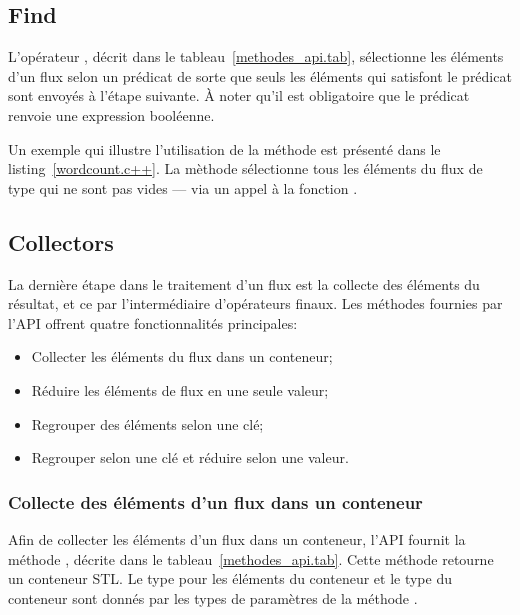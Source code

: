 \subsection{Find}

L'op\'erateur , d\'ecrit dans le tableau~\ref{methodes_api.tab}, s\'electionne les \'el\'ements d'un flux selon un pr\'edicat de sorte que seuls les \'el\'ements qui  satisfont le pr\'edicat sont envoy\'es \`a l'\'etape suivante. \`A noter qu'il est obligatoire que le pr\'edicat renvoie une expression bool\'eenne. 

Un exemple qui illustre l'utilisation de la m\'ethode  est pr\'esent\'e dans le listing~\ref{wordcount.c++}. La m\`ethode  s\'electionne tous les \'el\'ements du flux de type  qui ne sont pas vides --- via un appel \`a la fonction .


\subsection{Collectors}

La derni\`ere \'etape dans le traitement d'un flux est la collecte des \'el\'ements du r\'esultat, et ce par l'interm\'ediaire d'op\'erateurs finaux. Les m\'ethodes fournies par l'API offrent quatre fonctionnalit\'es principales: 

\begin{itemize}
	\item Collecter les \'el\'ements du flux dans un conteneur;	

	\item R\'eduire les \'el\'ements de flux en une seule valeur;

	\item Regrouper des \'el\'ements selon une cl\'e;
	
	\item Regrouper selon une cl\'e et r\'eduire selon une valeur.
\end{itemize}


\subsubsection{Collecte des \'el\'ements d'un flux dans un conteneur}

Afin de collecter les \'el\'ements d'un flux dans un conteneur, l'{API} fournit la m\'ethode , d\'ecrite dans le tableau~\ref{methodes_api.tab}. Cette m\'ethode retourne un conteneur {STL}. Le type pour les \'el\'ements du conteneur et le type du conteneur sont donn\'es par les types de param\`etres  de la m\'ethode . 

